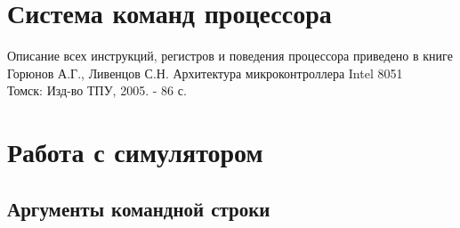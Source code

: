 \section{Система команд процессора}
Описание всех инструкций, регистров и поведения процессора приведено в книге \\[5mm]
Горюнов А.Г., Ливенцов С.Н. Архитектура микроконтроллера Intel 8051 \\
Томск: Изд-во ТПУ, 2005. - 86 с. \\

\section{Работа с симулятором}
\subsection{Аргументы командной строки}

